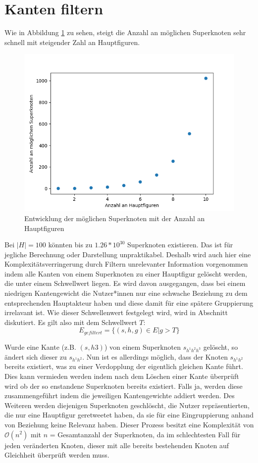 \section{Kanten filtern}
Wie in Abbildung \ref{fig:superknotenentwicklung} zu sehen, steigt die Anzahl an möglichen Superknoten sehr schnell mit steigender Zahl an Hauptfiguren.
\begin{figure}[h]
	\centering
	\includegraphics[width=0.7\linewidth]{images/Superknotenentwicklung}
	\caption[]{Entwicklung der möglichen Superknoten mit der Anzahl an Hauptfiguren}
	\label{fig:superknotenentwicklung}
\end{figure}
Bei $|H| = 100$ könnten bis zu $1.26*10^{30}$ Superknoten existieren. Das ist für jegliche Berechnung oder Darstellung unpraktikabel.
Deshalb wird auch hier eine Komplexitätsverringerung durch Filtern unrelevanter Information vorgenommen indem alle Kanten von einem Superknoten zu einer Hauptfigur gelöscht werden, die unter einem Schwellwert liegen. 
Es wird davon ausgegangen, dass  bei einem niedrigen Kantengewicht die Nutzer*innen nur eine schwache Beziehung zu dem entsprechenden Hauptakteur haben und diese damit für eine spätere Gruppierung irrelavant ist. 
Wie dieser Schwellenwert festgelegt wird, wird in Abschnitt diskutiert. 
Es gilt also mit dem Schwellwert $T$: \begin{equation}
	E_{gefiltert} = \{(s,h,g)\in E|g>T\}
\end{equation}

Wurde eine Kante (z.B. $(s,h3)$) von einem Superknoten $s_{h^1h^2h^3}$ gelöscht, so ändert sich dieser zu $s_{h^1h^2}$. Nun ist es allerdings möglich, dass der Knoten $s_{h^1h^2}$ bereits existiert, was zu einer Verdopplung der eigentlich gleichen Kante führt. Dies kann vermieden werden indem nach dem Löschen einer Kante überprüft wird ob der so enstandene Superknoten bereits existiert. Falls ja, werden diese zusammengeführt indem die jeweiligen Kantengewichte addiert werden.
Des Weiteren werden diejenigen Superknoten geschlöscht, die Nutzer repräsentierten, die nur eine Hauptfigur \gls{geretweetet} haben, da sie für eine Eingruppierung anhand von Beziehung keine Relevanz haben.
Dieser Prozess besitzt eine Komplexität von $\mathcal{O}(n^2)$ mit $n$ = Gesamtanzahl der Superknoten, da im schlechtesten Fall für jeden veränderten Knoten, dieser mit alle bereits bestehenden Knoten auf Gleichheit überprüft werden muss.
